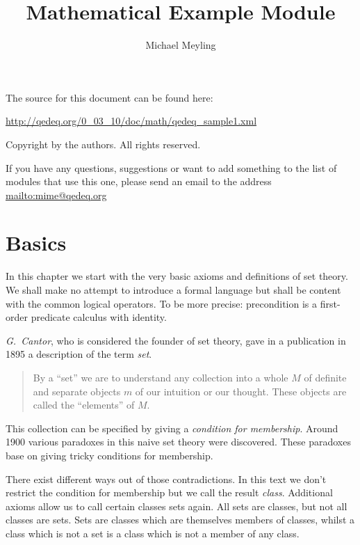 \documentclass[a4paper,german,10pt,twoside]{book}
\title{Mathematical Example Module}
\author{
Michael Meyling
}
\theoremstyle{definition}
\theoremstyle{remark}
\begin{document}
\maketitle

\setlength{\parskip}{5pt plus 2pt minus 1pt}
\mbox{}
\vfill

\par
The source for this document can be found here:
\par
\url{http://qedeq.org/0_03_10/doc/math/qedeq_sample1.xml}

\par
Copyright by the authors. All rights reserved.
\par
If you have any questions, suggestions or want to add something to the list of modules that use this one, please send an email to the address \url{mailto:mime@qedeq.org}

\setlength{\parskip}{0pt}
\tableofcontents

\setlength{\parskip}{5pt plus 2pt minus 1pt}

\chapter{Basics} \label{chapter0} \hypertarget{chapter0}{}

In this chapter we start with the very basic axioms and definitions of set theory. We shall make no attempt to introduce a formal language but shall be content with the common logical operators. To be more precise: precondition is a first-order predicate calculus with identity.

\par
\emph{G.~Cantor}, who is considered the founder of set theory, gave in a publication in 1895 a description of the term \emph{set}.

\begin{quote}
 By a ``set'' we are to understand any collection into a whole $M$ of definite and separate objects $m$ of our intuition or our thought. These objects are called the ``elements'' of $M$.
\end{quote}

\par
This collection can be specified by giving a \emph{condition for membership}. Around 1900 various paradoxes in this naive set theory were discovered. These paradoxes base on giving tricky conditions for membership.

\par
There exist different ways out of those contradictions. In this text we don't restrict the condition for membership but we call the result \emph{class}. Additional axioms allow us to call certain classes sets again. All sets are classes, but not all classes are sets. Sets are classes which are themselves members of classes, whilst a class which is not a set is a class which is not a member of any class.
\end{document}
